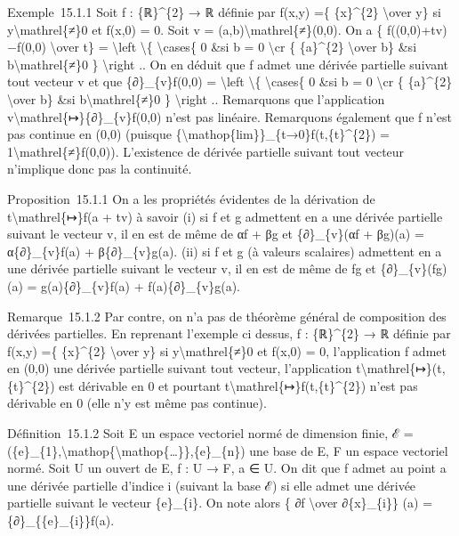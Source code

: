 \documentclass[]{article}
\begin{document}
Exemple~15.1.1 Soit f : \{ℝ\}\^{}\{2\} → ℝ définie par f(x,y) =\{
\{x\}\^{}\{2\} \textbackslash{}over y\} si
y\textbackslash{}mathrel\{≠\}0 et f(x,0) = 0. Soit v =
(a,b)\textbackslash{}mathrel\{≠\}(0,0). On a \{ f((0,0)+tv)−f(0,0)
\textbackslash{}over t\} = \textbackslash{}left \textbackslash{}\{
\textbackslash{}cases\{ 0 \&si b = 0 \textbackslash{}cr \{
\{a\}\^{}\{2\} \textbackslash{}over b\} \&si
b\textbackslash{}mathrel\{≠\}0 \} \textbackslash{}right .. On en déduit
que f admet une dérivée partielle suivant tout vecteur v et que
\{∂\}\_\{v\}f(0,0) = \textbackslash{}left \textbackslash{}\{
\textbackslash{}cases\{ 0 \&si b = 0 \textbackslash{}cr \{
\{a\}\^{}\{2\} \textbackslash{}over b\} \&si
b\textbackslash{}mathrel\{≠\}0 \} \textbackslash{}right .. Remarquons
que l'application v\textbackslash{}mathrel\{↦\}\{∂\}\_\{v\}f(0,0) n'est
pas linéaire. Remarquons également que f n'est pas continue en (0,0)
(puisque \{\textbackslash{}mathop\{lim\}\}\_\{t→0\}f(t,\{t\}\^{}\{2\}) =
1\textbackslash{}mathrel\{≠\}f(0,0)). L'existence de dérivée partielle
suivant tout vecteur n'implique donc pas la continuité.

Proposition~15.1.1 On a les propriétés évidentes de la dérivation de
t\textbackslash{}mathrel\{↦\}f(a + tv) à savoir (i) si f et g admettent
en a une dérivée partielle suivant le vecteur v, il en est de même de αf
+ βg et \{∂\}\_\{v\}(αf + βg)(a) = α\{∂\}\_\{v\}f(a) +
β\{∂\}\_\{v\}g(a). (ii) si f et g (à valeurs scalaires) admettent en a
une dérivée partielle suivant le vecteur v, il en est de même de fg et
\{∂\}\_\{v\}(fg)(a) = g(a)\{∂\}\_\{v\}f(a) + f(a)\{∂\}\_\{v\}g(a).

Remarque~15.1.2 Par contre, on n'a pas de théorème général de
composition des dérivées partielles. En reprenant l'exemple ci dessus, f
: \{ℝ\}\^{}\{2\} → ℝ définie par f(x,y) =\{ \{x\}\^{}\{2\}
\textbackslash{}over y\} si y\textbackslash{}mathrel\{≠\}0 et f(x,0) =
0, l'application f admet en (0,0) une dérivée partielle suivant tout
vecteur, l'application t\textbackslash{}mathrel\{↦\}(t,\{t\}\^{}\{2\})
est dérivable en 0 et pourtant
t\textbackslash{}mathrel\{↦\}f(t,\{t\}\^{}\{2\}) n'est pas dérivable en
0 (elle n'y est même pas continue).

Définition~15.1.2 Soit E un espace vectoriel normé de dimension finie, ℰ
=
(\{e\}\_\{1\},\textbackslash{}mathop\{\textbackslash{}mathop\{\ldots{}\}\},\{e\}\_\{n\})
une base de E, F un espace vectoriel normé. Soit U un ouvert de E, f : U
→ F, a ∈ U. On dit que f admet au point a une dérivée partielle d'indice
i (suivant la base ℰ) si elle admet une dérivée partielle suivant le
vecteur \{e\}\_\{i\}. On note alors \{ ∂f \textbackslash{}over
∂\{x\}\_\{i\}\} (a) = \{∂\}\_\{\{e\}\_\{i\}\}f(a).
\end{document}
